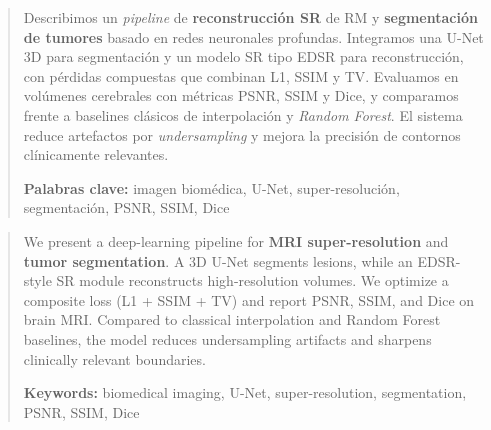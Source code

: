 \documentclass[12pt,a4paper,twoside,openright]{book}
\begin{document}


\frontmatter


\renewcommand{\abstractname}{Resumen}
\begin{abstract}
Describimos un \emph{pipeline} de \textbf{reconstrucción SR} de RM y
\textbf{segmentación de tumores} basado en redes neuronales profundas.
Integramos una U-Net 3D para segmentación y un modelo SR tipo EDSR para
reconstrucción, con pérdidas compuestas que combinan L1, SSIM y TV.
Evaluamos en volúmenes cerebrales con métricas PSNR, SSIM y Dice, y
comparamos frente a baselines clásicos de interpolación y \emph{Random
Forest}. El sistema reduce artefactos por \emph{undersampling} y mejora
la precisión de contornos clínicamente relevantes.
\medskip

\noindent\textbf{Palabras clave:} imagen biomédica, U-Net, super-resolución,
segmentación, PSNR, SSIM, Dice
\end{abstract}

\renewcommand{\abstractname}{Abstract}
\begin{abstract}
We present a deep-learning pipeline for \textbf{MRI super-resolution} and
\textbf{tumor segmentation}. A 3D U-Net segments lesions, while an EDSR-style
SR module reconstructs high-resolution volumes. We optimize a composite loss
(L1 + SSIM + TV) and report PSNR, SSIM, and Dice on brain MRI.
Compared to classical interpolation and Random Forest baselines, the model
reduces undersampling artifacts and sharpens clinically relevant boundaries.
\medskip

\noindent\textbf{Keywords:} biomedical imaging, U-Net, super-resolution,
segmentation, PSNR, SSIM, Dice
\end{abstract}
\end{document}
